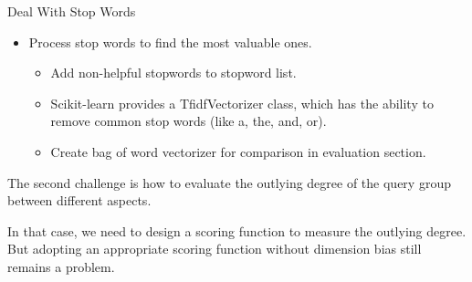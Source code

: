 \documentclass[
 size=14pt,
 paper=smartboard,  %
 mode=present, 		%
 display=slides, 	%
 style=tuliplab,  	%
 pauseslide,
 fleqn,leqno]{powerdot}
\begin{document}
\begin{slide}[toc=,bm=]{Deal With Stop Words}

  \begin{itemize}
  \item
  Process stop words to find the most valuable ones.
  
  \begin{itemize}
  \item
  Add non-helpful stopwords to stopword list.
  \item
  Scikit-learn provides a TfidfVectorizer class, which has the ability to remove common stop words (like a, the, and, or).
  \item
  Create bag of word vectorizer for comparison in evaluation section.
  
 
  \end{itemize}
  \end{itemize}
  
  \begin{note}
  The second challenge is how to evaluate the outlying degree of
  the query group between different aspects.
  
  In that case,
  we need to design a scoring function to measure the outlying degree.
  But adopting an appropriate scoring function without dimension bias still remains a problem.
  \end{note}
  
  \end{slide}
\end{document}
